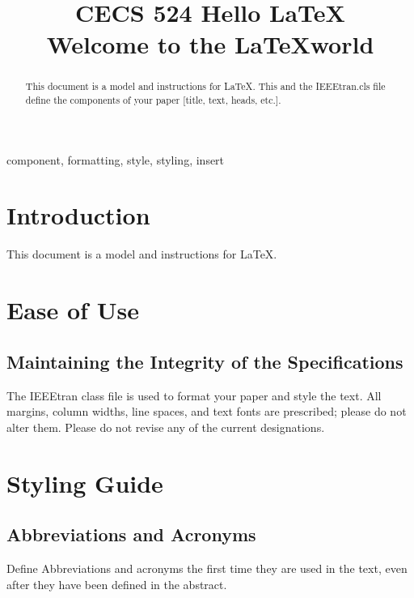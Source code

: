 \documentclass[conference]{IEEEtran}
\begin{document}
\title{CECS 524 Hello \LaTeX \\ {\small Welcome to the \LaTeX world}}

\author{
	}

\maketitle

\begin{abstract}
This document is a model and instructions for \LaTeX. This and the IEEEtran.cls file define the components of your paper [title, text, heads, etc.].
\end{abstract}

\begin{IEEEkeywords}
component, formatting, style, styling, insert
\end{IEEEkeywords}

\section{Introduction}
This document is a model and instructions for \LaTeX.
\section{Ease of Use}

\subsection{Maintaining the Integrity of the Specifications}

The IEEEtran class file is used to format your paper and style the text. All margins, column widths, line spaces, and text fonts are prescribed; please do not alter them. Please do not revise any of the current designations.

\section{Styling Guide}

\subsection{Abbreviations and Acronyms}
Define Abbreviations and acronyms the first time they are used in the text, even after they have been defined in the abstract.
\end{document}
